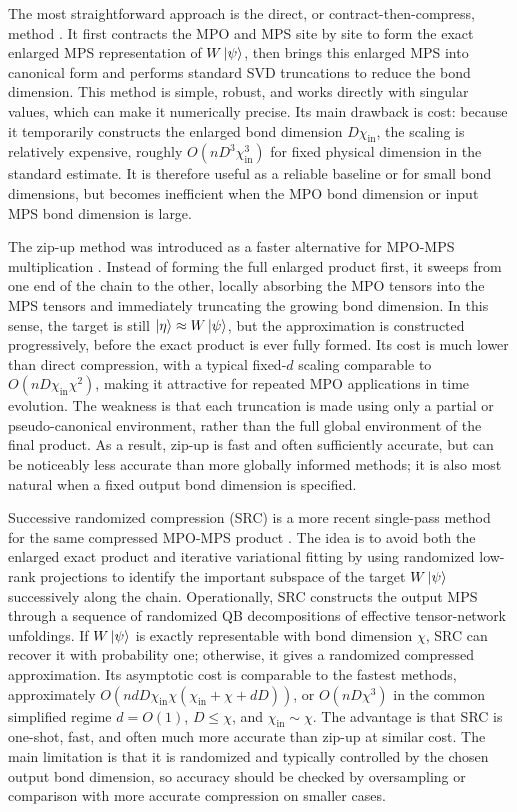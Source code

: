 \documentclass[12pt]{article}
\begin{document}
The most straightforward approach is the direct, or contract-then-compress, method \cite{grayQuimbPythonPackage2018}.
It first contracts the MPO and MPS site by site to form the exact enlarged MPS representation of \(W\ket{\psi}\), then brings this enlarged MPS into canonical form and performs standard SVD truncations to reduce the bond dimension.
This method is simple, robust, and works directly with singular values, which can make it numerically precise.
Its main drawback is cost: because it temporarily constructs the enlarged bond dimension \(D\chi_{\mathrm{in}}\), the scaling is relatively expensive, roughly \(O(nD^3\chi_{\mathrm{in}}^3)\) for fixed physical dimension in the standard estimate.
It is therefore useful as a reliable baseline or for small bond dimensions, but becomes inefficient when the MPO bond dimension or input MPS bond dimension is large.

The zip-up method was introduced as a faster alternative for MPO-MPS multiplication \cite{stoudenmireMinimallyEntangledTypical2010a}.
Instead of forming the full enlarged product first, it sweeps from one end of the chain to the other, locally absorbing the MPO tensors into the MPS tensors and immediately truncating the growing bond dimension.
In this sense, the target is still \(\ket{\eta}\approx W\ket{\psi}\), but the approximation is constructed progressively, before the exact product is ever fully formed.
Its cost is much lower than direct compression, with a typical fixed-\(d\) scaling comparable to \(O(nD\chi_{\mathrm{in}}\chi^2)\), making it attractive for repeated MPO applications in time evolution.
The weakness is that each truncation is made using only a partial or pseudo-canonical environment, rather than the full global environment of the final product.
As a result, zip-up is fast and often sufficiently accurate, but can be noticeably less accurate than more globally informed methods; it is also most natural when a fixed output bond dimension is specified.

Successive randomized compression (SRC) is a more recent single-pass method for the same compressed MPO-MPS product \cite{camanoSuccessiveRandomizedCompression2026b}.
The idea is to avoid both the enlarged exact product and iterative variational fitting by using randomized low-rank projections to identify the important subspace of the target \(W\ket{\psi}\) successively along the chain.
Operationally, SRC constructs the output MPS through a sequence of randomized QB decompositions of effective tensor-network unfoldings.
If \(W\ket{\psi}\) is exactly representable with bond dimension \(\chi\), SRC can recover it with probability one; otherwise, it gives a randomized compressed approximation.
Its asymptotic cost is comparable to the fastest methods, approximately \(O(ndD\chi_{\mathrm{in}}\chi(\chi_{\mathrm{in}}+\chi+dD))\), or \(O(nD\chi^3)\) in the common simplified regime \(d=O(1)\), \(D\leq \chi\), and \(\chi_{\mathrm{in}}\sim \chi\).
The advantage is that SRC is one-shot, fast, and often much more accurate than zip-up at similar cost.
The main limitation is that it is randomized and typically controlled by the chosen output bond dimension, so accuracy should be checked by oversampling or comparison with more accurate compression on smaller cases.
\end{document}
